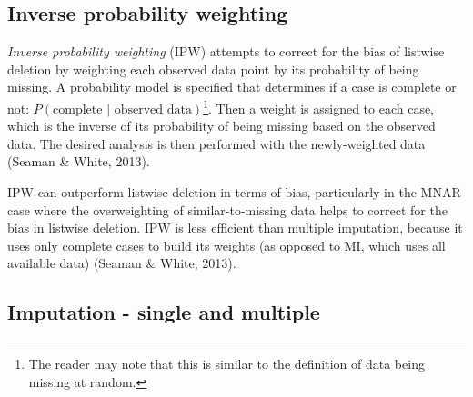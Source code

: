 \documentclass[12pt,twoside]{reedthesis}
\begin{document}
\hypertarget{inverse-probability-weighting}{%
\subsection{Inverse probability weighting}\label{inverse-probability-weighting}}

\emph{Inverse probability weighting} (IPW) attempts to correct for the bias of listwise deletion by weighting each observed data point by its probability of being missing. A probability model is specified that determines if a case is complete or not: \(P(\text{complete }|\text{ observed data})\)\footnote{The reader may note that this is similar to the definition of data being missing at random.}. Then a weight is assigned to each case, which is the inverse of its probability of being missing based on the observed data. The desired analysis is then performed with the newly-weighted data (Seaman \& White, 2013).

IPW can outperform listwise deletion in terms of bias, particularly in the MNAR case where the overweighting of similar-to-missing data helps to correct for the bias in listwise deletion. IPW is less efficient than multiple imputation, because it uses only complete cases to build its weights (as opposed to MI, which uses all available data) (Seaman \& White, 2013).

\hypertarget{imputation---single-and-multiple}{%
\subsection{Imputation - single and multiple}\label{imputation---single-and-multiple}}
\end{document}
